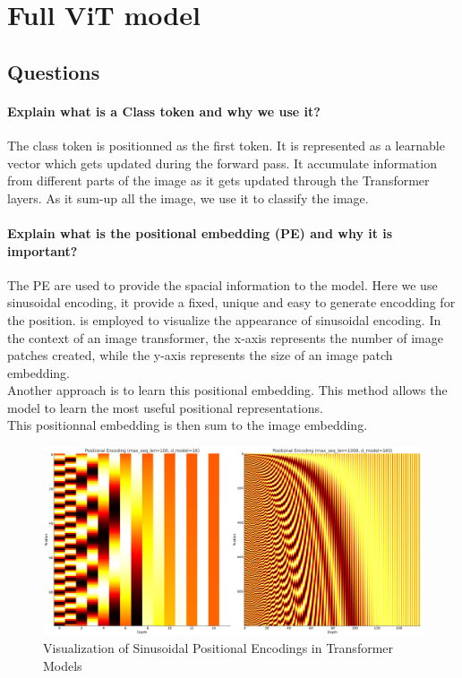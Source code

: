 \section{Full ViT model}

\subsection{Questions}

\paragraph{Explain what is a Class token and why we use it?}
The class token is positionned as the first token. It is represented as a learnable vector which gets updated during the forward pass. It accumulate information from different parts of the image as it gets updated through the Transformer layers. As it sum-up all the image, we use it to classify the image.

\paragraph{Explain what is the positional embedding (PE) and why it is important?}
The PE are used to provide the spacial information to the model. Here we use sinusoidal encoding, it provide a fixed, unique and easy to generate encodding for the position.  is employed to visualize the appearance of sinusoidal encoding. In the context of an image transformer, the x-axis represents the number of image patches created, while the y-axis represents the size of an image patch embedding.  \\
Another approach is to learn this positional embedding. This method allows the model to learn the most useful positional representations. \\
This positionnal embedding is then sum to the image embedding.

\begin{figure}[H]
    \centering
    \includegraphics*[width=.75\textwidth]{figs/Transformers/positional_encoding_subplot.pdf}
    \caption{Visualization of Sinusoidal Positional Encodings in Transformer Models}
    \label{fig:pe_viz}
\end{figure}

